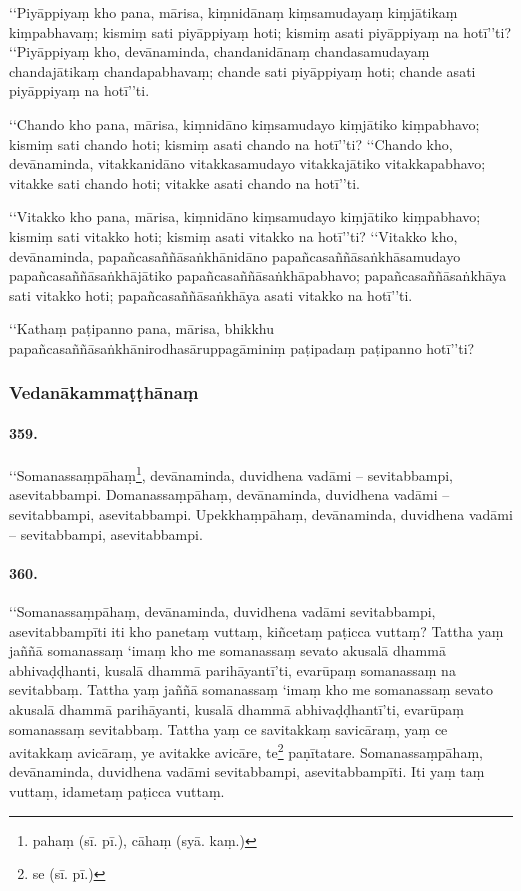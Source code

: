 ‘‘Piyāppiyaṃ kho pana, mārisa, kiṃnidānaṃ kiṃsamudayaṃ kiṃjātikaṃ kiṃpabhavaṃ; kismiṃ sati piyāppiyaṃ hoti; kismiṃ asati piyāppiyaṃ na hotī’’ti? ‘‘Piyāppiyaṃ kho, devānaminda, chandanidānaṃ chandasamudayaṃ chandajātikaṃ chandapabhavaṃ; chande sati piyāppiyaṃ hoti; chande asati piyāppiyaṃ na hotī’’ti.

‘‘Chando kho pana, mārisa, kiṃnidāno kiṃsamudayo kiṃjātiko kiṃpabhavo; kismiṃ sati chando hoti; kismiṃ asati chando na hotī’’ti? ‘‘Chando kho, devānaminda, vitakkanidāno vitakkasamudayo vitakkajātiko vitakkapabhavo; vitakke sati chando hoti; vitakke asati chando na hotī’’ti.

‘‘Vitakko kho pana, mārisa, kiṃnidāno kiṃsamudayo kiṃjātiko kiṃpabhavo; kismiṃ sati vitakko hoti; kismiṃ asati vitakko na hotī’’ti? ‘‘Vitakko kho, devānaminda, papañcasaññāsaṅkhānidāno papañcasaññāsaṅkhāsamudayo papañcasaññāsaṅkhājātiko papañcasaññāsaṅkhāpabhavo; papañcasaññāsaṅkhāya sati vitakko hoti; papañcasaññāsaṅkhāya asati vitakko na hotī’’ti.

‘‘Kathaṃ paṭipanno pana, mārisa, bhikkhu papañcasaññāsaṅkhānirodhasāruppagāminiṃ paṭipadaṃ paṭipanno hotī’’ti?

\subsubsection{Vedanākammaṭṭhānaṃ}

\paragraph{359.} ‘‘Somanassaṃpāhaṃ\footnote{pahaṃ (sī. pī.), cāhaṃ (syā. kaṃ.)}, devānaminda, duvidhena vadāmi – sevitabbampi, asevitabbampi. Domanassaṃpāhaṃ, devānaminda, duvidhena vadāmi – sevitabbampi, asevitabbampi. Upekkhaṃpāhaṃ, devānaminda, duvidhena vadāmi – sevitabbampi, asevitabbampi.

\paragraph{360.} ‘‘Somanassaṃpāhaṃ, devānaminda, duvidhena vadāmi sevitabbampi, asevitabbampīti iti kho panetaṃ vuttaṃ, kiñcetaṃ paṭicca vuttaṃ? Tattha yaṃ jaññā somanassaṃ ‘imaṃ kho me somanassaṃ sevato akusalā dhammā abhivaḍḍhanti, kusalā dhammā parihāyantī’ti, evarūpaṃ somanassaṃ na sevitabbaṃ. Tattha yaṃ jaññā somanassaṃ ‘imaṃ kho me somanassaṃ sevato akusalā dhammā parihāyanti, kusalā dhammā abhivaḍḍhantī’ti, evarūpaṃ somanassaṃ sevitabbaṃ. Tattha yaṃ ce savitakkaṃ savicāraṃ, yaṃ ce avitakkaṃ avicāraṃ, ye avitakke avicāre, te\footnote{se (sī. pī.)} paṇītatare. Somanassaṃpāhaṃ, devānaminda, duvidhena vadāmi sevitabbampi, asevitabbampīti. Iti yaṃ taṃ vuttaṃ, idametaṃ paṭicca vuttaṃ.

